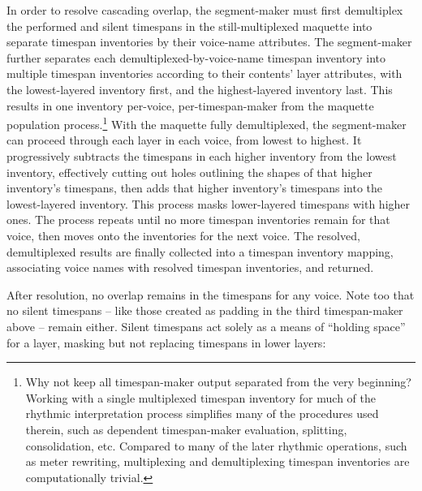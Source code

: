 \noindent In order to resolve cascading overlap, the segment-maker must first
demultiplex the performed and silent timespans in the still-multiplexed
maquette into separate timespan inventories by their voice-name attributes. The
segment-maker further separates each demultiplexed-by-voice-name timespan
inventory into multiple timespan inventories according to their contents' layer
attributes, with the lowest-layered inventory first, and the highest-layered
inventory last. This results in one inventory per-voice, per-timespan-maker
from the maquette population process.\footnote{Why not keep all timespan-maker
output separated from the very beginning? Working with a single multiplexed
timespan inventory for much of the rhythmic interpretation process simplifies
many of the procedures used therein, such as dependent timespan-maker
evaluation, splitting, consolidation, etc. Compared to many of the later
rhythmic operations, such as meter rewriting, multiplexing and demultiplexing
timespan inventories are computationally trivial.} With the maquette fully
demultiplexed, the segment-maker can proceed through each layer in each voice,
from lowest to highest. It progressively subtracts the timespans in each higher
inventory from the lowest inventory, effectively cutting out holes outlining
the shapes of that higher inventory's timespans, then adds that higher
inventory's timespans into the lowest-layered inventory. This process masks
lower-layered timespans with higher ones. The process repeats until no more
timespan inventories remain for that voice, then moves onto the inventories for
the next voice. The resolved, demultiplexed results are finally collected into
a timespan inventory mapping, associating voice names with resolved timespan
inventories, and returned.

\begin{comment}
<abjad>
demultiplexed_maquette = consort.SegmentMaker.resolve_maquette(
    timespan_inventory,
    )
</abjad>
\end{comment}

After resolution, no overlap remains in the timespans for any voice.
Note too that no silent timespans -- like those created as padding in the third
timespan-maker above -- remain either. Silent timespans act solely as a means
of \enquote{holding space} for a layer, masking but not replacing timespans in
lower layers:

\begin{comment}
<abjad>
show(demultiplexed_maquette, range_=(0, (21, 4)))
</abjad>
\end{comment}


